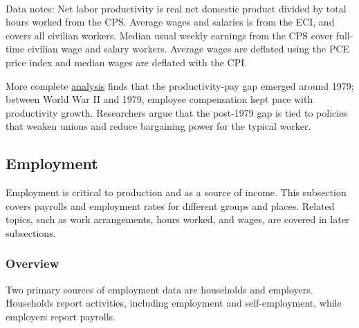 \begin{minipage}{0.76\textwidth}
\\
\footnotesize{Data notes: Net labor productivity is real net domestic product divided by total hours worked from the CPS. Average wages and salaries is from the ECI, and covers all civilian workers. Median usual weekly earnings from the CPS cover full-time civilian wage and salary workers. Average wages are deflated using the PCE price index and median wages are deflated with the CPI.}
\vspace{1mm}

\small More complete \href{https://www.epi.org/productivity-pay-gap/}{analysis} finds that the productivity-pay gap emerged around 1979; between World War II and 1979, employee compensation kept pace with productivity growth. Researchers argue that the post-1979 gap is tied to policies that weaken unions and reduce bargaining power for the typical worker. 
\end{minipage}
\newpage
\subsection*{Employment}
\begin{minipage}{0.76\textwidth} 
\hypertarget{labe}{\label{labe}}
\small Employment is critical to production and as a source of income. This subsection covers payrolls and employment rates for different groups and places. Related topics, such as work arrangements, hours worked, and wages, are covered in later subsections. 
\vspace*{-1mm}

\subsubsection*{Overview}
\vspace*{-0.5mm}

\small Two primary sources of employment data are households and employers. Households report activities, including employment and self-employment, while employers report payrolls.


\end{minipage}

